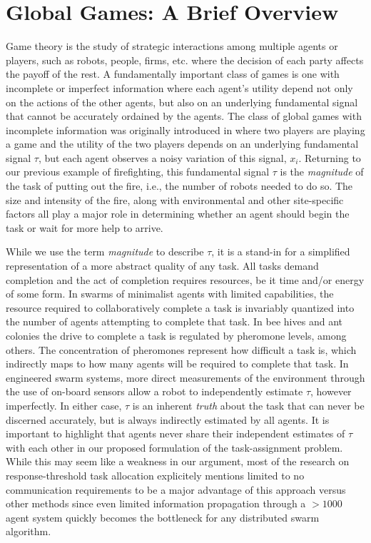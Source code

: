 \documentclass[conference]{ieeeconf}
\begin{document}
\section{Global Games: A Brief Overview}\label{sec:ggoverview}
Game theory is the study of strategic interactions among multiple agents or players, such as robots, people, firms, etc. where the decision of each party affects the payoff of the rest. A fundamentally important class of games is one with incomplete or imperfect information where each agent's utility depend not only on the actions of the other agents, but also on an underlying fundamental signal that cannot be accurately ordained by the agents. The class of global games with incomplete information was originally introduced in \cite{Carlsson1993} where two players are playing a game and the utility of the two players depends on an underlying fundamental signal $\tau$, but each agent observes a noisy variation of this signal, $x_i$. Returning to our previous example of firefighting, this fundamental signal $\tau$ is the \emph{magnitude} of the task of putting out the fire, i.e., the number of robots needed to do so. The size and intensity of the fire, along with environmental and other site-specific factors all play a major role in determining whether an agent should begin the task or wait for more help to arrive.

While we use the term \emph{magnitude} to describe $\tau$, it is a stand-in for a simplified representation of a more abstract quality of any task. All tasks demand completion and the act of completion requires resources, be it time and/or energy of some form. In swarms of minimalist agents with limited capabilities, the resource required to collaboratively complete a task is invariably quantized into the number of agents attempting to complete that task. In bee hives and ant colonies the drive to complete a task is regulated by pheromone levels, among others. The concentration of pheromones represent how difficult a task is, which indirectly maps to how many agents will be required to complete that task. In engineered swarm systems, more direct measurements of the environment through the use of on-board sensors allow a robot to independently estimate $\tau$, however imperfectly. In either case, $\tau$ is an inherent \emph{truth} about the task that can never be discerned accurately, but is always indirectly estimated by all agents. It is important to highlight that agents never share their independent estimates of $\tau$ with each other in our proposed formulation of the task-assignment problem. While this may seem like a weakness in our argument, most of the research on response-threshold task allocation explicitely mentions limited to no communication requirements to be a major advantage of this approach versus other methods since even limited information propagation through a $>1000$ agent system quickly becomes the bottleneck for any distributed swarm algorithm.
\end{document}
